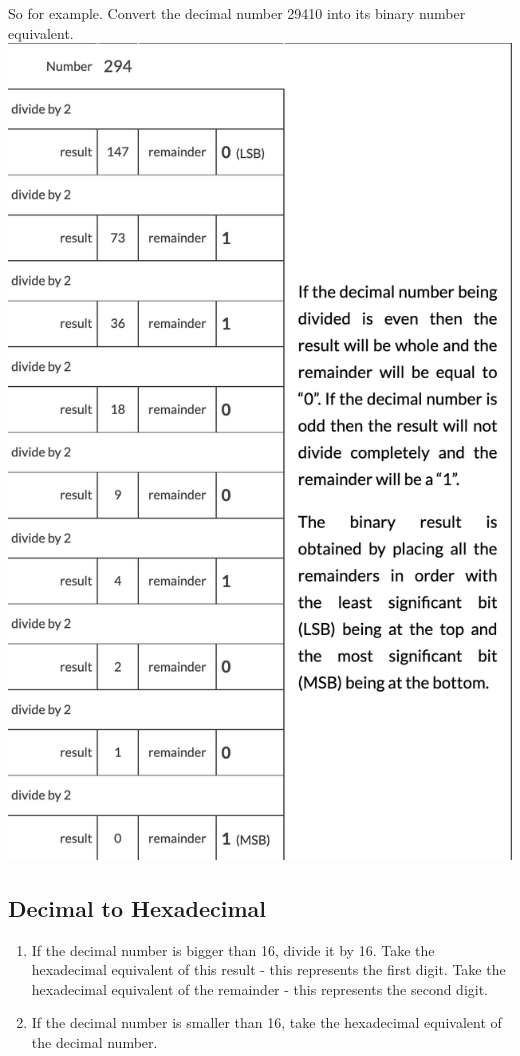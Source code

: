 \documentclass[pstricks,border=11pt]{article}
\begin{document}
\hfill \break

So for example. Convert the decimal number 29410 into its binary number equivalent.
\hfill \break
\includegraphics[scale=.5]{294.png}
\hfill \break

\subsection{Decimal to Hexadecimal}
\begin{enumerate}
    \item If the decimal number is bigger than 16, divide it by 16. Take the hexadecimal equivalent of this result - this represents the first digit. Take the hexadecimal equivalent of the remainder - this represents the second digit.
    \item If the decimal number is smaller than 16, take the hexadecimal equivalent of the decimal number.
\end{enumerate}
\end{document}
